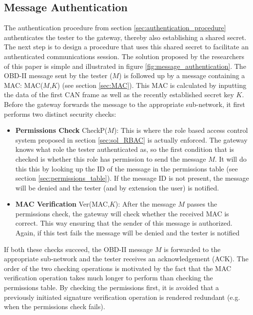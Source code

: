 \subsection{Message Authentication}
\label{subsec:message_authentication}

The authentication procedure from section \ref{sec:authentication_procedure} authenticates the tester to the gateway, thereby also establishing a shared secret. The next step is to design a procedure that uses this shared secret to facilitate an authenticated communications session. The solution proposed by the researchers of this paper is simple and illustrated in figure \ref{fig:message_authentication}. The OBD-II message sent by the tester ($M$) is followed up by a message containing a MAC: MAC($M$,$K$) (see section \ref{sec:MAC}). This MAC is calculated by inputting the data of the first CAN frame as well as the recently established secret key $K$. Before the gateway forwards the message to the appropriate sub-network, it first performs two distinct security checks: 
\begin{itemize}
	\item \textbf{Permissions Check} CheckP($M$): This is where the role based access control system proposed in section \ref{sec:sol_RBAC} is actually enforced. The gateway knows what role the tester authenticated as, so the first condition that is checked is whether this role has permission to send the message $M$. It will do this this by looking up the ID of the message in the permissions table (see section \ref{sec:permissions_table}). If the message ID is not present, the message will be denied and the tester (and by extension the user) is notified.
	
	\item \textbf{MAC Verification} Ver(MAC,$K$): After the message $M$ passes the permissions check, the gateway will check whether the received MAC is correct. This way ensuring that the sender of this message is authorized. Again, if this test fails the message will be denied and the tester is notified
\end{itemize}
If both these checks succeed, the OBD-II message $M$ is forwarded to the appropriate sub-network and the tester receives an acknowledgement (ACK). The order of the two checking operations is motivated by the fact that the MAC verification operation takes much longer to perform than checking the permissions table. By checking the permissions first, it is avoided that a previously initiated signature verification operation is rendered redundant (e.g. when the permissions check fails).

